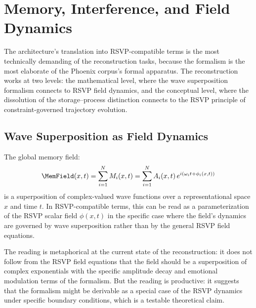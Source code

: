 
\chapter{Memory, Interference, and Field Dynamics}
\label{ch:memory-field}


\noindent
The \MEMeight{} architecture's translation into
RSVP-compatible terms is the most technically demanding
of the reconstruction tasks, because the \MEMeight{}
formalism is the most elaborate of the Phoenix corpus's
formal apparatus. The reconstruction works at two levels:
the mathematical level, where the wave superposition
formalism connects to RSVP field dynamics, and the
conceptual level, where the dissolution of the
storage--process distinction connects to the RSVP
principle of constraint-governed trajectory evolution.

\section{Wave Superposition as Field Dynamics}
\label{sec:wave-field}

The \MEMeight{} global memory field:
\[
  \MemField(x,t) = \sum_{i=1}^{N} M_i(x,t)
  = \sum_{i=1}^{N} A_i(x,t)\,e^{i(\omega_i t + \phi_i(x,t))}
\]
is a superposition of complex-valued wave functions
over a representational space $x$ and time $t$. In
RSVP-compatible terms, this can be read as a
parameterization of the RSVP scalar field $\phi(x,t)$
in the specific case where the field's dynamics are
governed by wave superposition rather than by the
general RSVP field equations.

The reading is metaphorical at the current state of
the reconstruction: it does not follow from the RSVP
field equations that the field should be a superposition
of complex exponentials with the specific amplitude
decay and emotional modulation terms of the \MEMeight{}
formalism. But the reading is productive: it suggests
that the \MEMeight{} formalism might be derivable as
a special case of the RSVP dynamics under specific
boundary conditions, which is a testable theoretical
claim.

